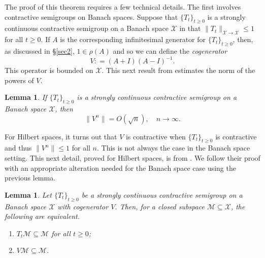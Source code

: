\documentclass[11pt]{amsart}
\numberwithin{equation}{section}
\theoremstyle{plain}
\newtheorem{Lemma}[equation]{Lemma}
\theoremstyle{definition}
\renewcommand{\leq}{\leqslant}
\renewcommand{\geq}{\geqslant}
\renewcommand{\subset}{\subseteq}
\newcommand{\0}{{\color{lightgray}0}}
\begin{document}
The proof of this theorem requires a few technical details. The first  involves contractive semigroups on Banach spaces. Suppose that $\{T_t\}_{t \geq 0}$ is a strongly continuous contractive semigroup on a Banach space $\mathcal{X}$ in that $\|T_t\|_{\mathcal{X} \to \mathcal{X}} \leq 1$ for all $t \geq 0$. If $A$ is the corresponding infinitesimal generator for $\{T_t\}_{t \geq 0}$, then, as discussed in \S \ref{sec2},  $1 \in \rho(A)$ and so we can define the {\em cogenerator}
$$V: = (A + I)(A - I)^{-1}.$$
This operator is bounded on $\mathcal{X}$. 
This  next result from \cite[Thm.~5.2]{MR2460937} estimates the norm of the powers of $V$. 

\begin{Lemma}\label{Oososos000PP}
If $\{T_{t}\}_{t \geq 0}$ is a strongly continuous contractive semigroup on a Banach space $\mathcal{X}$, then 
$$\|V^{n}\| = O(\sqrt{n}), \quad n \to \infty.$$
\end{Lemma}


For Hilbert spaces, it turns out that $V$ is contractive when $\{T_t\}_{t \geq 0}$ is contractive and thus $\|V^n\| \leq 1$ for all $n$. This is not always the case in the Banach space setting.
This next detail, proved for Hilbert spaces, is from \cite[p.~146]{MR629828}. We follow their proof with an appropriate alteration needed for the Banach space case using the previous lemma. 

\begin{Lemma}\label{poisdfdfhHHSJdhSJD}
Let $\{T_{t}\}_{t \geq 0}$ be a strongly continuous contractive semigroup on a Banach space $\mathcal{X}$ with cogenerator $V$. Then,  for a closed subspace $\mathcal{M} \subset \mathcal{X}$, the following are equivalent. 
\begin{enumerate}
\item $T_t \mathcal{M} \subset \mathcal{M}$ for all $t \geq 0$; 
\item $V \mathcal{M} \subset \mathcal{M}$. 
\end{enumerate}
\end{Lemma}
\end{document}
